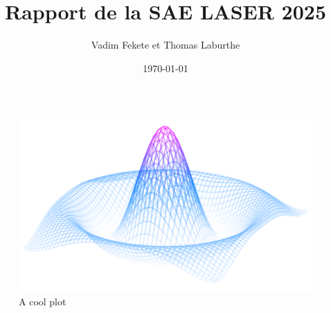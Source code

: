 \documentclass{article}
\title{Rapport de la SAE LASER 2025}
\author{Vadim Fekete et Thomas Laburthe}
\date{\today}
\begin{document}
\maketitle
\begin{figure}[H]
	\centering
	\includegraphics[scale=1]{plot_example.png}
	\caption{A cool plot}

\end{figure}
\end{document}
